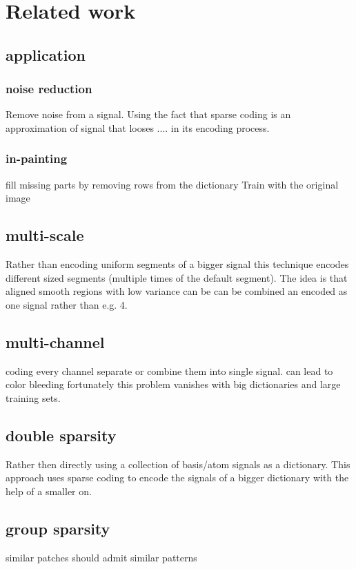 \section{Related work}
\subsection{application}
\subsubsection{noise reduction}
Remove noise from a signal. Using the fact that sparse coding 
is an approximation of signal that looses .... in its encoding process. 

\subsubsection{in-painting}
fill missing parts by removing rows from the dictionary
Train with the original image

\subsection{multi-scale}
Rather than encoding uniform segments of a bigger signal this technique encodes different sized 
segments (multiple times of the default segment). The idea is that aligned smooth regions with low variance can be 
can be combined an encoded as one signal rather than e.g. 4. 

\cite{saprio}
\subsection{multi-channel}
coding every channel separate or combine them
into single signal. can lead to color bleeding \cite{mairal08sparse}
fortunately this problem vanishes with big dictionaries and large training sets. \cite{mairal08sparse}

\subsection{double sparsity}
Rather then directly using a collection of basis/atom signals as a dictionary. This approach uses sparse coding
to encode the signals of a bigger dictionary with the help of a smaller on. \cite{double sparsity}

\subsection{group sparsity}
similar patches should admit similar patterns
  
